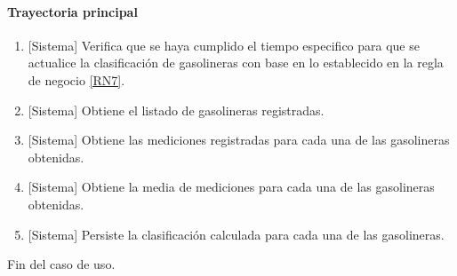 \paragraph{Trayectoria principal}
	\begin{enumerate}
		\item {[Sistema]} Verifica que se haya cumplido el tiempo especifico para que se actualice la clasificación de gasolineras con base en lo establecido en la regla de negocio \ref{RN7}.
		\item {[Sistema]} Obtiene el listado de gasolineras registradas.
		\item {[Sistema]} Obtiene las mediciones registradas para cada una de las gasolineras obtenidas.
		\item {[Sistema]} Obtiene la media de mediciones para cada una de las gasolineras obtenidas.
		\item {[Sistema]} Persiste la clasificación calculada para cada una de las gasolineras.
	\end{enumerate}
	Fin del caso de uso.


